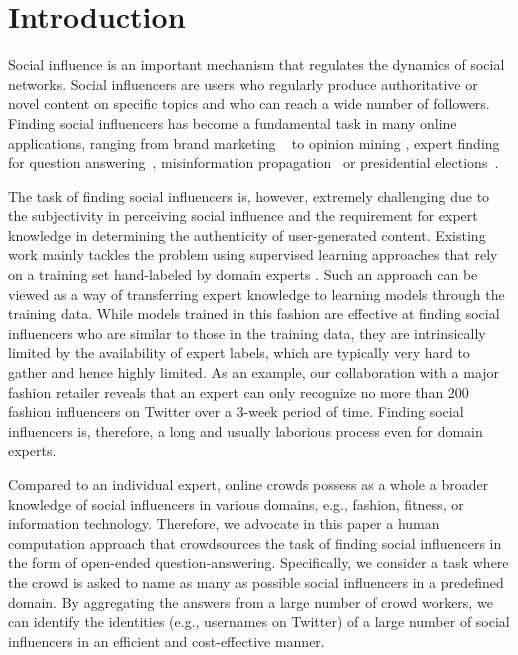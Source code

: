 \section{Introduction}

Social influence is an important mechanism that regulates the dynamics of social networks. Social influencers are users who regularly produce authoritative or novel content on specific topics and who can reach a wide number of followers. Finding social influencers has become a fundamental task in many online applications, ranging from brand marketing
~\cite{richardson2002mining,van2007new} to opinion mining \cite{pang2008opinion,li2012mining}, expert finding for question 
answering~\cite{riahi2012finding}, misinformation propagation~\cite{DBLP:conf/icde/SongHL17} or presidential elections~\cite{bond201261}.

The task of finding social influencers is, however, extremely challenging due to the subjectivity in perceiving social influence and the requirement for expert knowledge in determining the authenticity of user-generated content. Existing work mainly tackles the problem using supervised learning approaches that rely on a training set hand-labeled by domain experts \cite{Cheng2014,Lehmann2013,wei2016learning}. Such an approach can be viewed as a way of transferring expert knowledge to learning models through the training data. While models trained in this fashion are effective at finding social influencers who are similar to those in the training data, they are intrinsically limited by the availability of expert labels, which are typically very hard to gather and hence highly limited. As an example, our collaboration with a major fashion retailer reveals that an expert can only recognize no more than 200 fashion influencers on Twitter over a 3-week period of time. Finding social influencers is, therefore, a long and usually laborious process even for domain experts.

Compared to an individual expert, online crowds 
possess as a whole a broader knowledge of social influencers in various domains, e.g., fashion, fitness, or information technology. Therefore, we advocate in this paper a human computation approach that crowdsources the task of finding social influencers in the form of open-ended question-answering. Specifically, we consider a task where the crowd is asked to name as many as possible social influencers in a predefined domain. By aggregating the answers from a large number of crowd workers, we can identify the identities (e.g., usernames on Twitter) of a large number of social influencers in an efficient and cost-effective manner. 

